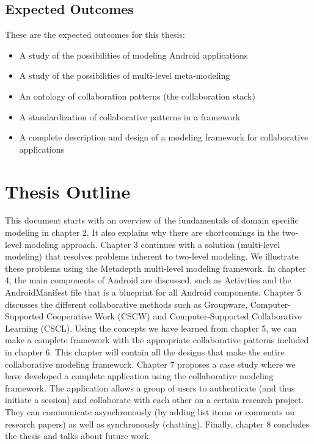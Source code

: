 \subsection{Expected Outcomes}

These are the expected outcomes for this thesis:

\begin{itemize}
\item{A study of the possibilities of modeling Android applications}
\item{A study of the possibilities of multi-level meta-modeling}
\item{An ontology of collaboration patterns (the collaboration stack)}
\item{A standardization of collaborative patterns in a framework}
\item{A complete description and design of a modeling framework for collaborative applications}
\end{itemize}

\section{Thesis Outline}

This document starts with an overview of the fundamentals of domain specific modeling in chapter 2. It also explains why there are shortcomings in the two-level modeling approach. Chapter 3 continues with a solution (multi-level modeling) that resolves problems inherent to two-level modeling. We illustrate these problems using the Metadepth multi-level modeling framework. In chapter 4, the main components of Android are discussed, such as Activities and the AndroidManifest file that is a blueprint for all Android components. Chapter 5 discusses the different collaborative methods such as Groupware, Computer-Supported Cooperative Work (CSCW) and Computer-Supported Collaborative Learning (CSCL). Using the concepts we have learned from chapter 5, we can make a complete framework with the appropriate collaborative patterns included in chapter 6. This chapter will contain all the designs that make the entire collaborative modeling framework. Chapter 7 proposes a case study where we have developed a complete application using the collaborative modeling framework. The application allows a group of users to authenticate (and thus initiate a session) and collaborate with each other on a certain research project. They can communicate asynchronously (by adding list items or comments on research papers) as well as synchronously (chatting). Finally, chapter 8 concludes the thesis and talks about future work.
